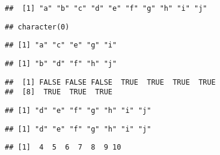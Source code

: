 \documentclass[paper=a4,10pt,div=17,headsepline,BCOR=12mm,twoside,open=right]{scrbook}\usepackage{knitr}
\begin{document}
\begin{knitrout}\footnotesize
{}\color{fgcolor}\begin{kframe}
\begin{alltt}
\hlstd{a[}\hlstd{]}
\end{alltt}
\begin{verbatim}
##  [1] "a" "b" "c" "d" "e" "f" "g" "h" "i" "j"
\end{verbatim}
\begin{alltt}
\hlstd{a[}\hlstd{]}
\end{alltt}
\begin{verbatim}
## character(0)
\end{verbatim}
\begin{alltt}
\hlstd{a[}\hlstd{(}\hlstd{,} \hlstd{)]}
\end{alltt}
\begin{verbatim}
## [1] "a" "c" "e" "g" "i"
\end{verbatim}
\begin{alltt}
\hlstd{a[}\hlstd{(}\hlstd{,} \hlstd{)]}
\end{alltt}
\begin{verbatim}
## [1] "b" "d" "f" "h" "j"
\end{verbatim}
\begin{alltt}
 \hlopt{>} 
\end{alltt}
\begin{verbatim}
##  [1] FALSE FALSE FALSE  TRUE  TRUE  TRUE  TRUE
##  [8]  TRUE  TRUE  TRUE
\end{verbatim}
\begin{alltt}
\hlstd{a[a} \hlopt{>} \hlstd{]}
\end{alltt}
\begin{verbatim}
## [1] "d" "e" "f" "g" "h" "i" "j"
\end{verbatim}
\begin{alltt}
 \hlkwb{<-}  \hlopt{>} 
\end{alltt}
\begin{verbatim}
## [1] "d" "e" "f" "g" "h" "i" "j"
\end{verbatim}
\begin{alltt}
 \hlopt{>} \hlstd{)}
\end{alltt}
\begin{verbatim}
## [1]  4  5  6  7  8  9 10
\end{verbatim}

\end{kframe}
\end{knitrout}
\end{document}
